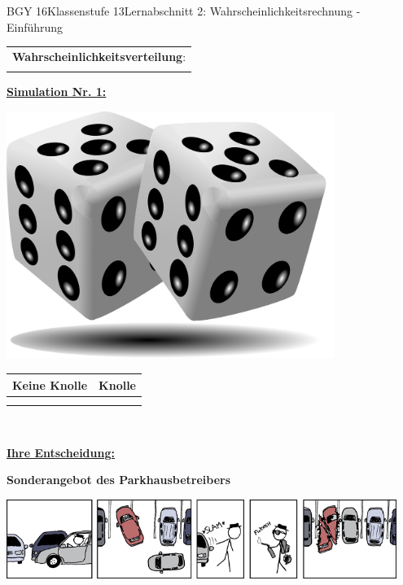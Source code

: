 \documentclass[oneside,openany,headings=optiontotoc,11pt,numbers=noenddot]{scrreprt}
\begin{document}
\begin{worksheet}{BGY 16}{Klassenstufe 13}{Lernabschnitt 2: Wahrscheinlichkeitsrechnung - Einführung}
\begin{framed}
\begin{tabularx}{\textwidth}{X}
				\\
				\textbf{Wahrscheinlichkeitsverteilung}:\\
				\\
			\end{tabularx}
		\end{framed}
		\noindent
		\underline{\textbf{Simulation Nr. 1:}}\\
		\par\noindent
		\begin{minipage}{0.15\textwidth}
			\includegraphics[width=0.8\textwidth]{../99_Bilder/04_WKR/dice.png}
		\end{minipage}
		\hfill
		\begin{minipage}{0.88\textwidth}
			\begin{tabularx}{0.95\textwidth}{|X|X|}
				\hline
				\textbf{Keine Knolle} & \textbf{Knolle}\\
				\hline
				& \\
				& \\
				\hline
			\end{tabularx}
		\end{minipage}\\
		\par\noindent
		\underline{\textbf{Ihre Entscheidung:}}
		\newpage
		\begin{framed}
			\noindent
			\begin{minipage}{0.35\textwidth}
				\Huge{\textbf{Sonderangebot des Parkhausbetreibers}}\\
			\end{minipage}
			\hfill
			\begin{minipage}{0.68\textwidth}
				\includegraphics[width=0.95\textwidth]{../99_Bilder/04_WKR/parking.png}\\

\end{minipage}
\end{framed}
\end{worksheet}
\end{document}
